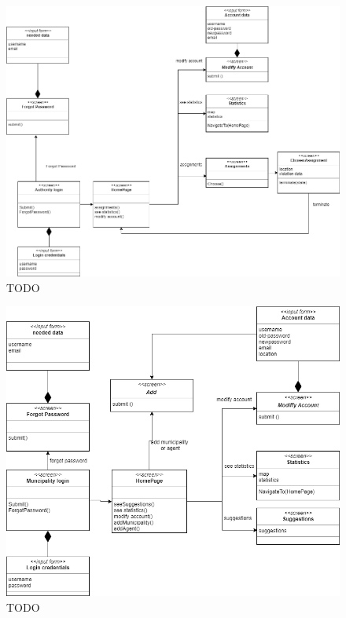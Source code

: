 \begin{figure}[h]
\centering
\includegraphics[width=\textwidth]{Images/ux2-correct.png}
\caption{\label{fig:ls}TODO }
\end{figure}
\begin{figure}[h]
\centering
\includegraphics[width=\textwidth]{Images/ux3-correct.png}
\caption{\label{fig:ls}TODO }
\end{figure}
